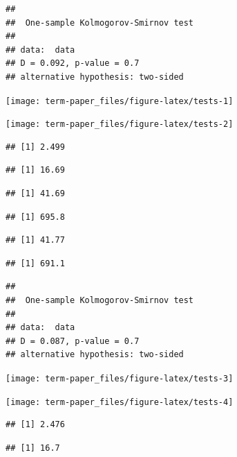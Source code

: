 \documentclass[9pt,twocolumn,twoside,]{pnas-new}
\begin{document}
\begin{verbatim}
## 
##  One-sample Kolmogorov-Smirnov test
## 
## data:  data
## D = 0.092, p-value = 0.7
## alternative hypothesis: two-sided
\end{verbatim}

\begin{flushleft}\texttt{[image: term-paper\_files/figure-latex/tests-1]} \end{flushleft}

\begin{flushleft}\texttt{[image: term-paper\_files/figure-latex/tests-2]} \end{flushleft}

\begin{verbatim}
## [1] 2.499
\end{verbatim}

\begin{verbatim}
## [1] 16.69
\end{verbatim}

\begin{verbatim}
## [1] 41.69
\end{verbatim}

\begin{verbatim}
## [1] 695.8
\end{verbatim}

\begin{verbatim}
## [1] 41.77
\end{verbatim}

\begin{verbatim}
## [1] 691.1
\end{verbatim}

\begin{verbatim}
## 
##  One-sample Kolmogorov-Smirnov test
## 
## data:  data
## D = 0.087, p-value = 0.7
## alternative hypothesis: two-sided
\end{verbatim}

\begin{flushleft}\texttt{[image: term-paper\_files/figure-latex/tests-3]} \end{flushleft}

\begin{flushleft}\texttt{[image: term-paper\_files/figure-latex/tests-4]} \end{flushleft}

\begin{verbatim}
## [1] 2.476
\end{verbatim}

\begin{verbatim}
## [1] 16.7
\end{verbatim}
\end{document}
